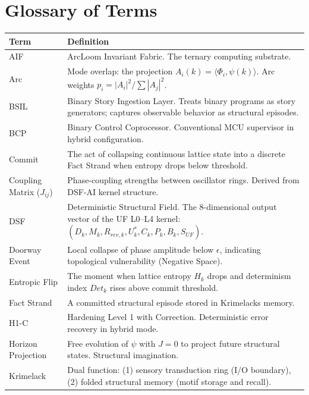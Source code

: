 \documentclass[11pt, a4paper]{report}
\begin{document}
\chapter{Glossary of Terms}

\begin{longtable}{@{}p{4cm}p{10.5cm}@{}}
\toprule
\textbf{Term} & \textbf{Definition} \\
\midrule
\endhead
AIF & ArcLoom Invariant Fabric. The ternary computing substrate. \\
Arc & Mode overlap: the projection $A_i(k) = \langle \Phi_i, \psi(k) \rangle$.
     Arc weights $p_i = |A_i|^2 / \sum |A_j|^2$. \\
BSIL & Binary Story Ingestion Layer. Treats binary programs as story
       generators; captures observable behavior as structural episodes. \\
BCP & Binary Control Coprocessor. Conventional MCU supervisor in hybrid
      configuration. \\
Commit & The act of collapsing continuous lattice state into a discrete
         Fact Strand when entropy drops below threshold. \\
Coupling Matrix ($J_{ij}$) & Phase-coupling strengths between oscillator
                             rings. Derived from DSF-AI kernel structure. \\
DSF & Deterministic Structural Field. The 8-dimensional output vector of
      the UF L0--L4 kernel: $(D_k, M_k, R_{rev,k}, U^*_k, C_k, P_k, B_k, S_{UF})$. \\
Doorway Event & Local collapse of phase amplitude below $\epsilon$,
                indicating topological vulnerability (Negative Space). \\
Entropic Flip & The moment when lattice entropy $H_k$ drops and
                determinism index $Det_k$ rises above commit threshold. \\
Fact Strand & A committed structural episode stored in Krimelacks memory. \\
H1-C & Hardening Level 1 with Correction. Deterministic error recovery
       in hybrid mode. \\
Horizon Projection & Free evolution of $\psi$ with $J=0$ to project
                     future structural states. Structural imagination. \\
Krimelack & Dual function: (1) sensory transduction ring (I/O boundary),
            (2) folded structural memory (motif storage and recall). \\

\end{longtable}
\end{document}

